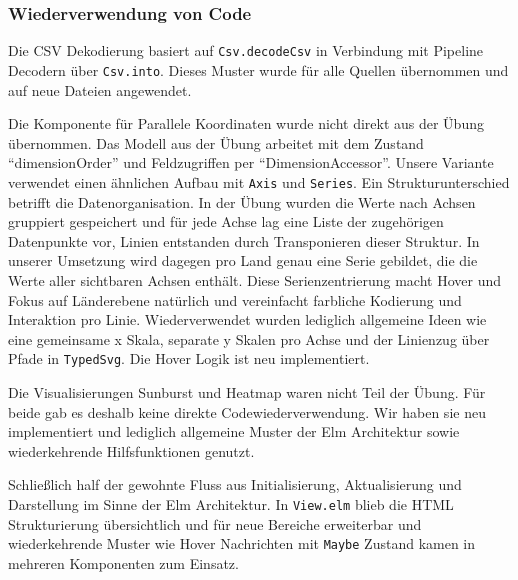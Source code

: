 \subsubsection{Wiederverwendung von Code}
Die CSV Dekodierung basiert auf \texttt{Csv.decodeCsv} in Verbindung mit Pipeline Decodern über \texttt{Csv.into}. Dieses Muster wurde für alle Quellen übernommen und auf neue Dateien angewendet.

Die Komponente für Parallele Koordinaten wurde nicht direkt aus der Übung übernommen. Das Modell aus der Übung arbeitet mit dem Zustand \enquote{dimensionOrder} und Feldzugriffen per \enquote{DimensionAccessor}. Unsere Variante verwendet einen ähnlichen Aufbau mit \texttt{Axis} und \texttt{Series}. Ein Strukturunterschied betrifft die Datenorganisation. In der Übung wurden die Werte nach Achsen gruppiert gespeichert und für jede Achse lag eine Liste der zugehörigen Datenpunkte vor, Linien entstanden durch Transponieren dieser Struktur. In unserer Umsetzung wird dagegen pro Land genau eine Serie gebildet, die die Werte aller sichtbaren Achsen enthält. Diese Serienzentrierung macht Hover und Fokus auf Länderebene natürlich und vereinfacht farbliche Kodierung und Interaktion pro Linie. Wiederverwendet wurden lediglich allgemeine Ideen wie eine gemeinsame x Skala, separate y Skalen pro Achse und der Linienzug über Pfade in \texttt{TypedSvg}. Die Hover Logik ist neu implementiert.

Die Visualisierungen Sunburst und Heatmap waren nicht Teil der Übung. Für beide gab es deshalb keine direkte Codewiederverwendung. Wir haben sie neu implementiert und lediglich allgemeine Muster der Elm Architektur sowie wiederkehrende Hilfsfunktionen genutzt.

Schließlich half der gewohnte Fluss aus Initialisierung, Aktualisierung und Darstellung im Sinne der Elm Architektur. In \texttt{View.elm} blieb die HTML Strukturierung übersichtlich und für neue Bereiche erweiterbar und wiederkehrende Muster wie Hover Nachrichten mit \texttt{Maybe} Zustand kamen in mehreren Komponenten zum Einsatz.
